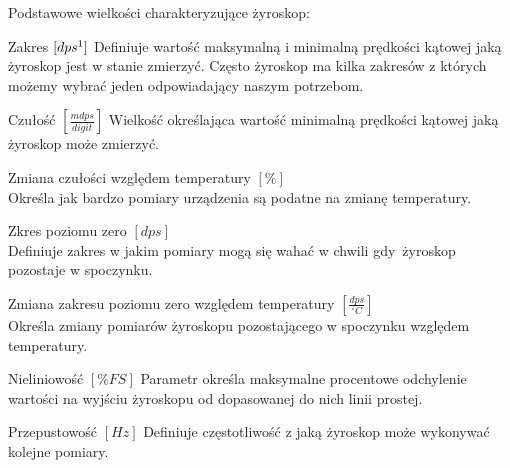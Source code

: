 Podstawowe wielkości charakteryzujące żyroskop:

\begin{basedescript}{\desclabelstyle{\pushlabel}\desclabelwidth{45mm}}
\setlength{\parsep}{2pt}
\setlength{\itemsep}{6mm}
\setlength{\parskip}{2pt}
\item[Zakres {$[dps\footnote{dps - stopień na sekundę}]$}]
	Definiuje wartość maksymalną i minimalną prędkości kątowej jaką żyroskop
	jest w stanie zmierzyć. Często żyroskop ma kilka zakresów z których możemy wybrać jeden odpowiadający naszym potrzebom.
\item[Czułość {$[\frac{mdps}{digit}]$}] 
	Wielkość określająca wartość minimalną prędkości kątowej jaką żyroskop może
	zmierzyć.
\item[Zmiana czułości względem temperatury {$[\%]$}] \hfill \\
	Określa jak bardzo pomiary urządzenia są podatne na zmianę temperatury.
\item[Zkres poziomu zero {$[dps]$}] \hfill \\
	Definiuje zakres w jakim pomiary mogą się wahać w chwili gdy~żyroskop pozostaje
	w spoczynku.
\item[Zmiana zakresu poziomu zero względem temperatury
{$[\frac{dps}{^{\circ}C}]$}] \hfill \\
	Określa zmiany pomiarów żyroskopu pozostającego w spoczynku względem
	temperatury.
\item[Nieliniowość {$[\% FS]$}] 
	Parametr określa maksymalne procentowe odchylenie wartości na wyjściu żyroskopu
	od dopasowanej do nich linii prostej.
\item[Przepustowość {$[Hz]$}] 
	Definiuje częstotliwość z jaką żyroskop może wykonywać kolejne pomiary.
\end{basedescript}


